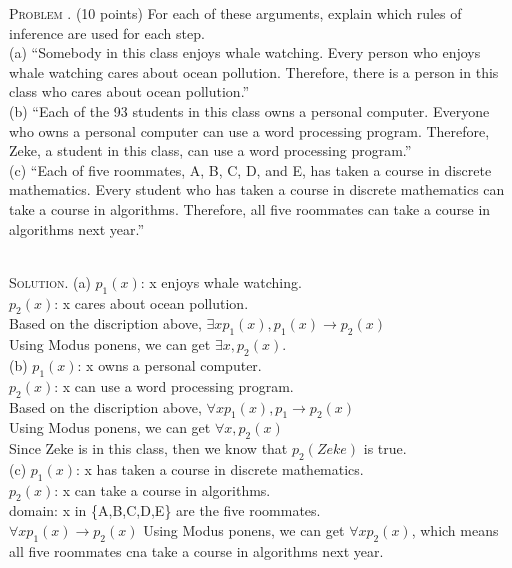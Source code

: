 \documentclass[12pt, a4paper, oneside]{article}
\newenvironment{problem}{\stepcounter{problemname}\par\noindent\textsc{Problem \arabic{problemname}. }}{\\\par}
\newenvironment{solution}{\par\noindent\textsc{Solution. }}{\\\par}
\newcounter{problemname}
\begin{document}
\begin{problem}
(10 points) For each of these arguments, explain which rules of inference are used for each step.\\
    (a) “Somebody in this class enjoys whale watching. Every person who enjoys whale watching cares about ocean pollution. Therefore, there is a person in this class who cares about ocean pollution.”\\
    (b) “Each of the 93 students in this class owns a personal computer. Everyone who owns a personal computer can use a word processing program. Therefore, Zeke, a student in this class, can use a word processing program.”\\
    (c) “Each of five roommates, A, B, C, D, and E, has taken a course in discrete mathematics. Every student who has taken a course in discrete mathematics can take a course in algorithms. Therefore, all five roommates can take a course in algorithms next year.”\\    
\end{problem}
\begin{solution}
    (a) $p_{1}(x)$: x enjoys whale watching.\\
    $p_{2}(x)$: x cares about ocean pollution.\\
    Based on the discription above, $\exists x p_{1}(x), p_{1}(x) \rightarrow p_{2}(x)$\\ Using Modus ponens, we can get $\exists x, p_{2}(x)$.\\
    (b) $p_{1}(x)$: x owns a personal computer.\\
    $p_{2}(x)$: x can use a word processing program.\\
    Based on the discription above, $\forall xp_{1}(x),p_{1} \rightarrow p_{2}(x)$\\
    Using Modus ponens, we can get $\forall x, p_{2}(x)$\\ Since Zeke is in this class, then we know that $p_{2}(Zeke)$ is true.\\  
    (c) $p_{1}(x)$: x has taken a course in discrete mathematics.\\
    $p_{2}(x)$: x can take a course in algorithms.\\
    domain: x in \{A,B,C,D,E\} are the five roommates.\\
    $\forall x p_{1}(x) \rightarrow p_{2}(x)$ Using Modus ponens, we can get $\forall x p_{2}(x)$, which means all five roommates cna take a course in algorithms next year.  
\end{solution}
\end{document}
